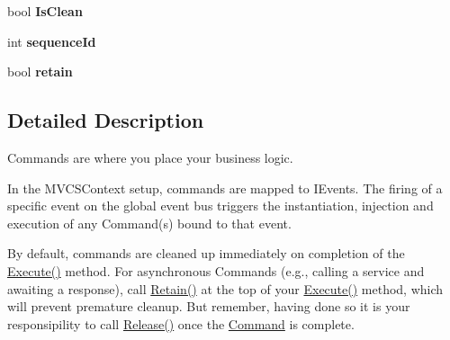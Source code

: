 \begin{DoxyCompactItemize}
\item 
\hypertarget{classstrange_1_1extensions_1_1command_1_1impl_1_1_command_a4086381430cb62a0e575c295f2c86354}{bool {\bfseries Is\-Clean}}\label{classstrange_1_1extensions_1_1command_1_1impl_1_1_command_a4086381430cb62a0e575c295f2c86354}

\item 
\hypertarget{classstrange_1_1extensions_1_1command_1_1impl_1_1_command_aa73766a45e3f739d77662fb2e909ee1e}{int {\bfseries sequence\-Id}}\label{classstrange_1_1extensions_1_1command_1_1impl_1_1_command_aa73766a45e3f739d77662fb2e909ee1e}

\item 
\hypertarget{classstrange_1_1extensions_1_1command_1_1impl_1_1_command_adf51b3ae205b21b57e76ba3aad11bc74}{bool {\bfseries retain}}\label{classstrange_1_1extensions_1_1command_1_1impl_1_1_command_adf51b3ae205b21b57e76ba3aad11bc74}

\end{DoxyCompactItemize}


\subsection{Detailed Description}
Commands are where you place your business logic. 

In the M\-V\-C\-S\-Context setup, commands are mapped to I\-Events. The firing of a specific event on the global event bus triggers the instantiation, injection and execution of any Command(s) bound to that event.

By default, commands are cleaned up immediately on completion of the {\ttfamily \hyperlink{classstrange_1_1extensions_1_1command_1_1impl_1_1_command_a4a1155270428842c342482c6885b2652}{Execute()}} method. For asynchronous Commands (e.\-g., calling a service and awaiting a response), call {\ttfamily \hyperlink{classstrange_1_1extensions_1_1command_1_1impl_1_1_command_ae1fd4be633a9619861930197b51ad6ea}{Retain()}} at the top of your {\ttfamily \hyperlink{classstrange_1_1extensions_1_1command_1_1impl_1_1_command_a4a1155270428842c342482c6885b2652}{Execute()}} method, which will prevent premature cleanup. But remember, having done so it is your responsipility to call {\ttfamily \hyperlink{classstrange_1_1extensions_1_1command_1_1impl_1_1_command_a41896e346d95419f179c8af2ccb5696d}{Release()}} once the \hyperlink{classstrange_1_1extensions_1_1command_1_1impl_1_1_command}{Command} is complete.

